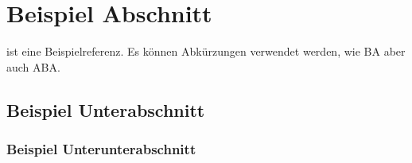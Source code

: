 \section{Beispiel Abschnitt}
\cite{latex:companion} ist eine Beispielreferenz.
Es können Abkürzungen verwendet werden, wie \ac{BA} aber auch \ac{ABA}.

\subsection{Beispiel Unterabschnitt}

\subsubsection{Beispiel Unterunterabschnitt}

\Blindtext{}
